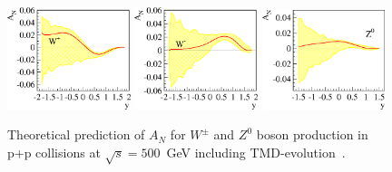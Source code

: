 \documentclass{PoS}
\begin{document}
\begin{figure}[htbp]
  \centering
  \includegraphics[width=0.32\textwidth]{w_plus.eps}
  \includegraphics[width=0.32\textwidth]{w_minus.eps}
  \includegraphics[width=0.32\textwidth]{z0.eps}
  \caption{Theoretical prediction of $A_{N}$ for $W^{\pm}$ and $Z^{0}$ boson production in p+p collisions at $\sqrt{s}=500$~GeV including TMD-evolution~\cite{Kang:2014}.}
  \label{Fig:An-prediction}
\end{figure}
\end{document}
